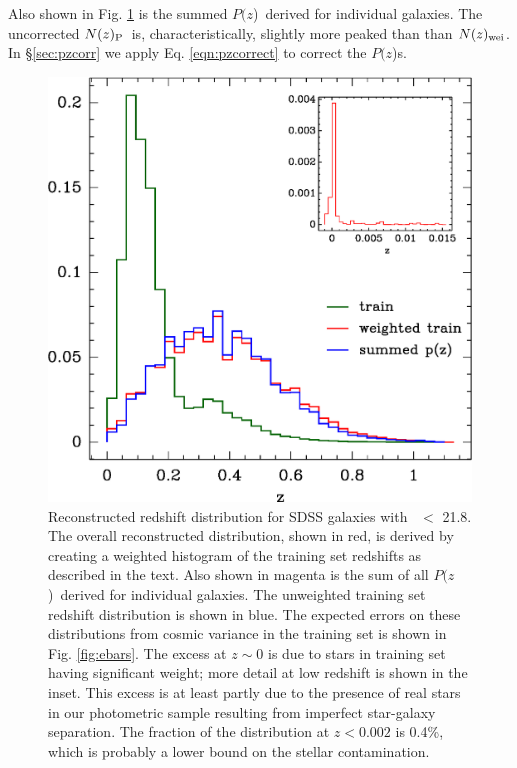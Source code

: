 \documentclass[preprint]{aastex}
\newcommand{\rmax}{21.8}
\newcommand{\pofz}{$P(z$)}
\newcommand{\nwei}{N(z)_{\rm wei}}
\newcommand{\npz}{N(z)_{\rm P}}
\begin{document}
Also shown in Fig. \ref{fig:pofz} is the summed \pofz\ derived for individual
galaxies.  The uncorrected $\npz$\ is, characteristically, slightly more peaked than
than $\nwei$.
In \S \ref{sec:pzcorr} we apply Eq. \ref{eqn:pzcorrect} to correct the \pofz s.

\begin{figure}[p] \centering
    \includegraphics[scale=0.9]{figures/zweight-10-zhist-withorig-withsum-12.eps}

    \caption{Reconstructed redshift distribution for SDSS galaxies with \rmag\
    $ < $ \rmax.  The overall reconstructed distribution, shown in red, is
    derived by creating a weighted histogram of the training set redshifts as
    described in the text.  Also shown in magenta is the sum of all \pofz\
    derived for individual galaxies.  The unweighted training set redshift
    distribution is shown in blue.  The expected errors on these distributions
    from cosmic variance in the training set is shown in Fig.  \ref{fig:ebars}.
    The excess at $z \sim 0$ is due to stars in training set having significant
    weight; more detail at low redshift is shown in the inset.  This excess is
    at least partly due to the presence of real stars in our photometric sample
    resulting from imperfect star-galaxy separation.  The fraction of the
    distribution at $z < 0.002$ is 0.4\%, which is probably a lower bound on
    the stellar contamination.  \label{fig:pofz}}

    \vspace{2em}
\end{figure}
\end{document}
